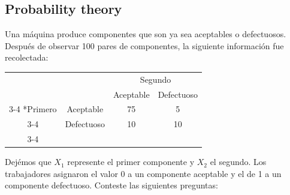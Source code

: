\documentclass[11pt]{exam}
\begin{document}
%
%
%
\begin{questions}
\section*{Probability theory}
\addpoints
\question Una m\'aquina produce componentes que son ya sea aceptables o defectuosos. Despu\'es de observar 100 pares de componentes, la siguiente informaci\'on fue recolectada:


 \begin{table}[h!]
	\centering
    \setlength{\extrarowheight}{2pt}
    \begin{tabular}{cc|c|c|}
      & \multicolumn{1}{c}{} & \multicolumn{2}{c}{Segundo}\\
      & \multicolumn{1}{c}{} & \multicolumn{1}{c}{Aceptable}  & \multicolumn{1}{c}{Defectuoso} \\\cline{3-4}
      \multirow{2}*{Primero}  & Aceptable & 75 & 5 \\\cline{3-4}
      & Defectuoso & 10 & 10 \\\cline{3-4}
    \end{tabular}
  \end{table}


Dej\'emos que $X_1$ represente el primer componente y $X_2$ el segundo. Los trabajadores asignaron el valor 0 a un componente aceptable y el de 1 a un componente defectuoso. Conteste las siguientes preguntas:



\end{questions}
\end{document}
